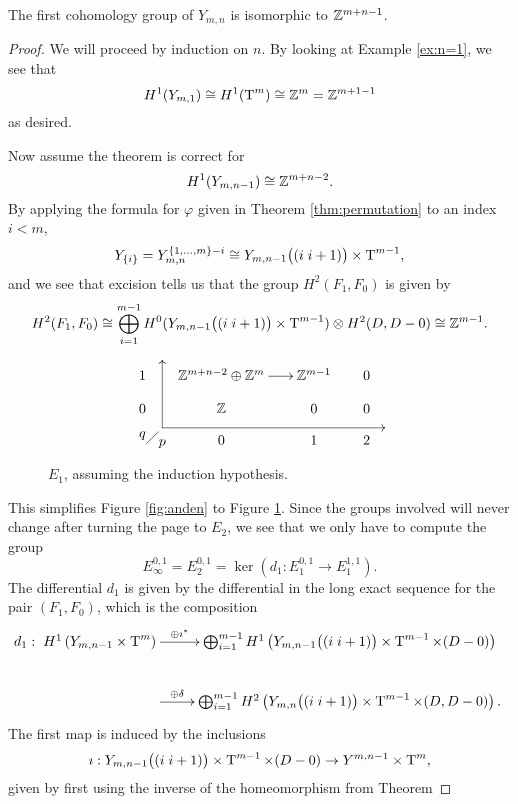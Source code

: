 \begin{theorem}
  \label{thm:forste}
  The first cohomology group of $Y_{m,n}$ is isomorphic to $\mathbb{Z}^{m+n-1}$.
\end{theorem}
\begin{proof}
  We will proceed by induction on $n$. By looking at Example
  \ref{ex:n=1}, we see that
  \[ H^1(Y_{m,1}) \cong H^1(\operatorname{T}^{m}) \cong \mathbb{Z}^m = \mathbb{Z}^{m+1-1} \]
  as desired.

  Now assume the theorem is correct for 
  \[ H^1(Y_{m,n-1}) \cong \mathbb{Z}^{m+n-2}. \]
  By applying the formula for $\varphi$ given in Theorem
  \ref{thm:permutation} to an index $i < m$,
  \[ Y_{\left\{ i \right\}} = Y^{\left\{ 1,\dots,m \right\}-i}_{m,n} \cong Y_{m,n-1}\big((i\;
  i+1)\big) \times \operatorname{T}^{m-1}, \]
  and we see that excision tells us that the group $H^2(F_1,F_0)$ is
  given by
  \[ H^2(F_1,F_0) \cong \bigoplus_{i=1}^{m-1} H^0(Y_{m,n-1}\big((i\;
  i+1)\big)\times\operatorname{T}^{m-1}) \otimes H^2(D,D-0) \cong \mathbb{Z}^{m-1}. \]
  \begin{figure}[ht]
    \[ \xy
    (5,4); (5,-13); **\dir{-}; (5,4); *\dir{>};
    (5,-13); (61,-13); **\dir{-}; *\dir{<};
    (0,-15)*{q}; (5,-17)*{p};
    (1,-17); (4,-14); **\dir{-};
    (0,0)\xymatrix@R=1em@C=1.7em{
      1 & \Z^{m+n-2}\oplus\Z^m \ar[r]& \Z^{m-1} & 0 \\
      0 & \Z & 0 & 0 \\
      & 0 & 1 & 2
    } \endxy \]
    \caption{$E_1$, assuming the induction hypothesis.}
    \label{fig:tredje}
  \end{figure}
  This simplifies Figure \ref{fig:anden} to Figure
  \ref{fig:tredje}. Since the groups involved will never change after
  turning the page to $E_2$, we see that we only have to compute the
  group
  \[ E_\infty^{0,1} = E_2^{0,1} = \ker \left( d_1 : E_1^{0,1} \to
    E_1^{1,1} \right). \]
  The differential $d_1$ is given by the differential in the long
  exact sequence for the pair $(F_1,F_0)$, which is the composition
  \[ d_1 : \xymatrix{ H^1\left(Y_{m,n-1}\times \T^m\right)
    \ar[r]^-{\oplus\imath^*}  & \bigoplus_{i=1}^{m-1}
    H^1\left(Y_{m,n-1}\big((i\; i+1)\big)\times \T^{m-1} \times
      (D-0)\right)  \\
    \hspace{8.1em}
    \ar[r]^-{\oplus\delta} & \bigoplus_{i=1}^{m-1}
    H^2\left(Y_{m,n}\big((i\; i+1)\big)\times \T^{m-1} \times
      (D,D-0)\right).}\]
  The first map is induced by the inclusions
  \[ \imath : Y_{m,n-1}\big((i\; i+1)\big) \times \operatorname{T}^{m-1} \times (D-0)
  \to Y^{m,n-1}\times \operatorname{T}^m, \] 
  given by first using the inverse of the homeomorphism from Theorem

\end{proof}

